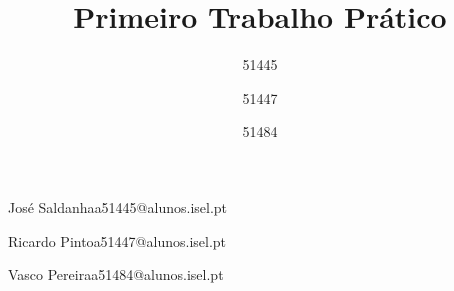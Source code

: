 \def\thetitle{%
 Primeiro Trabalho Prático
}
\def\theauthor{%
 JRV
}

\title{ \thetitle }

\author{51445}{José Saldanha}{a51445@alunos.isel.pt}
\author{51447}{Ricardo Pinto}{a51447@alunos.isel.pt}
\author{51484}{Vasco Pereira}{a51484@alunos.isel.pt}



